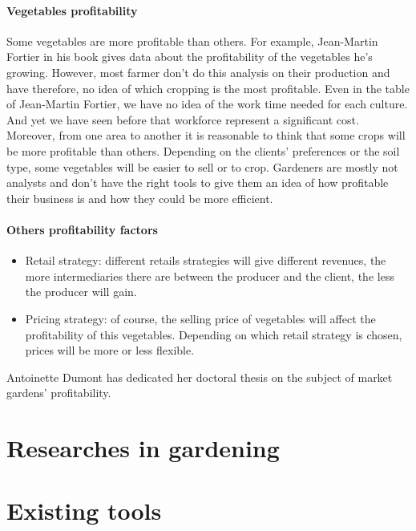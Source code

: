 \paragraph{Vegetables profitability}
Some vegetables are more profitable than others. For example, Jean-Martin Fortier \cite{fortier} in his book gives data about the profitability of the vegetables he's growing. However, most farmer don't do this analysis on their production and have therefore, no idea of which cropping is the most profitable. Even in the table of Jean-Martin Fortier, we have no idea of the work time needed for each culture. And yet we have seen before that workforce represent a significant cost.
Moreover, from one area to another it is reasonable to think that some crops will be more profitable than others. Depending on the clients' preferences or the soil type, some vegetables will be easier to sell or to crop.
Gardeners are mostly not analysts and don't have the right tools to give them an idea of how profitable their business is and how they could be more efficient.

\paragraph{Others profitability factors}

\begin{itemize}
\item Retail strategy: different retails strategies will give different revenues, the more intermediaries there are between the producer and the client, the less the producer will gain.
\item Pricing strategy: of course, the selling price of vegetables will affect the profitability of this vegetables. Depending on which retail strategy is chosen, prices will be more or less flexible.
\end{itemize}

Antoinette Dumont has dedicated her doctoral thesis on the subject of market gardens' profitability.\cite{adumont}

\section{Researches in gardening}


\section{Existing tools}

